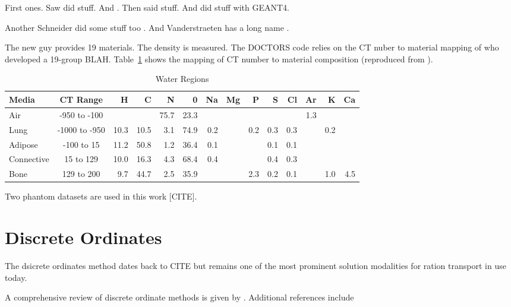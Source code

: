 First ones.
Saw \citep{ref:sawc} did stuff. And \citep{ref:plessisf}. Then \citet{ref:schneideru} said stuff. And \citet{ref:kimh} did stuff with GEANT4.

Another Schneider did some stuff too \citep{ref:schneiderw}. And Vanderstraeten has a long name \citep{ref:vanderstraetenb}.

The new guy provides 19 materials. The density is measured.
The DOCTORS code relies on the CT nuber to material mapping of \citet{ref:ottossonr} who developed a 19-group BLAH. Table~\ref{table:ctmap} shows the mapping of CT number to material composition (reproduced from \citep{ref:ottossonr}).

\begin{table}[ht]
\caption{Water Regions}
\centering 
\begin{tabular}{l c r r r r r r r r r r r r}
\hline \hline   
Media       & CT Range      & H    & C    & N    & 0    & Na  & Mg & P    & S   & Cl  & Ar  & K   & Ca \\ [0.5ex] 
\hline
Air         & -950 to -100  &      &      & 75.7 & 23.3 &     &    &      &     &     & 1.3 &     &       \\
Lung        & -1000 to -950 & 10.3 & 10.5 & 3.1  & 74.9 & 0.2 &    & 0.2  & 0.3 & 0.3 &     & 0.2 &       \\
Adipose     & -100 to 15    & 11.2 & 50.8 & 1.2  & 36.4 & 0.1 &    &      & 0.1 & 0.1 &     &     &       \\
Connective  & 15 to 129     & 10.0 & 16.3 & 4.3  & 68.4 & 0.4 &    &      & 0.4 & 0.3 &     &     &       \\
Bone        & 129 to 200    & 9.7  & 44.7 & 2.5  & 35.9 &     &    & 2.3  & 0.2 & 0.1 &     & 1.0 & 4.5   \\  [1ex]
\hline
\end{tabular}
\label{table:ctmap}
\end{table}

Two phantom datasets are used in this work [CITE].

\section{Discrete Ordinates}\label{sec:discordlit}
The dsicrete ordinates method dates back to CITE but remains one of the most prominent solution modalities for ration transport in use today.

A comprehensive review of discrete ordinate methods is given by \citet{ref:lewise}. Additional references include 


